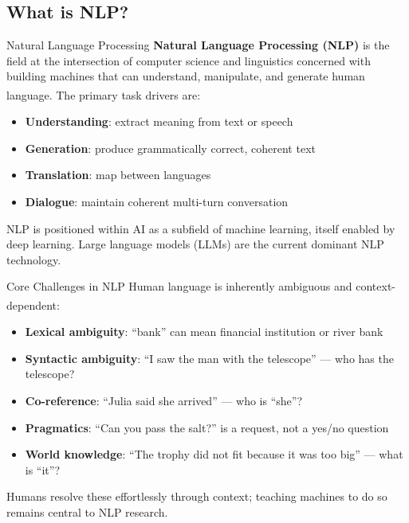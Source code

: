 \subsection{What is NLP?}

\begin{v3topic}{Natural Language Processing}
    \textbf{Natural Language Processing (NLP)} is the field at the intersection of computer science and linguistics concerned with building machines that can understand, manipulate, and generate human language\textsuperscript{\cite[][p.~3]{dhamaniIntroductionGenerativeAI2024}}.
    The primary task drivers are:
    \begin{itemize}
        \item \textbf{Understanding}: extract meaning from text or speech
        \item \textbf{Generation}: produce grammatically correct, coherent text
        \item \textbf{Translation}: map between languages
        \item \textbf{Dialogue}: maintain coherent multi-turn conversation
    \end{itemize}
    NLP is positioned within AI as a subfield of machine learning, itself enabled by deep learning.
    Large language models (LLMs) are the current dominant NLP technology.

\end{v3topic}
\begin{v3topic}{Core Challenges in NLP}
    Human language is inherently ambiguous and context-dependent\textsuperscript{\cite[][p.~9]{dhamaniIntroductionGenerativeAI2024}}:
    \begin{itemize}
        \item \textbf{Lexical ambiguity}: ``bank'' can mean financial institution or river bank
        \item \textbf{Syntactic ambiguity}: ``I saw the man with the telescope'' --- who has the telescope?
        \item \textbf{Co-reference}: ``Julia said she arrived'' --- who is ``she''?
        \item \textbf{Pragmatics}: ``Can you pass the salt?'' is a request, not a yes/no question
        \item \textbf{World knowledge}: ``The trophy did not fit because it was too big'' --- what is ``it''?
    \end{itemize}
    Humans resolve these effortlessly through context; teaching machines to do so remains central to NLP research.

\end{v3topic}
